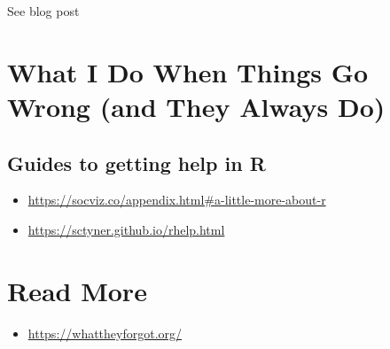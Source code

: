 \documentclass[]{book}
\providecommand{\tightlist}{%
  \setlength{\itemsep}{0pt}\setlength{\parskip}{0pt}}
\begin{document}
See blog post

\hypertarget{what-i-do-when-things-go-wrong-and-they-always-do}{%
\chapter{What I Do When Things Go Wrong (and They Always Do)}\label{what-i-do-when-things-go-wrong-and-they-always-do}}

\hypertarget{guides-to-getting-help-in-r}{%
\section{Guides to getting help in R}\label{guides-to-getting-help-in-r}}

\begin{itemize}
\tightlist
\item
  \url{https://socviz.co/appendix.html\#a-little-more-about-r}
\item
  \url{https://sctyner.github.io/rhelp.html}
\end{itemize}

\hypertarget{read-more}{%
\chapter{Read More}\label{read-more}}

\begin{itemize}
\tightlist
\item
  \url{https://whattheyforgot.org/}
\end{itemize}


\end{document}
